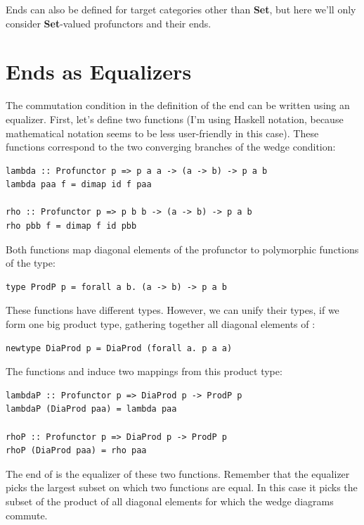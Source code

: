 Ends can also be defined for target categories other than \textbf{Set},
but here we'll only consider \textbf{Set}-valued profunctors and their
ends.

\section{Ends as Equalizers}\label{ends-as-equalizers}

The commutation condition in the definition of the end can be written
using an equalizer. First, let's define two functions (I'm using Haskell
notation, because mathematical notation seems to be less user-friendly
in this case). These functions correspond to the two converging branches
of the wedge condition:

\begin{Verbatim}[commandchars=\\\{\}]
lambda :: Profunctor p => p a a -> (a -> b) -> p a b
lambda paa f = dimap id f paa

rho :: Profunctor p => p b b -> (a -> b) -> p a b
rho pbb f = dimap f id pbb
\end{Verbatim}
Both functions map diagonal elements of the profunctor  to
polymorphic functions of the type:

\begin{Verbatim}[commandchars=\\\{\}]
type ProdP p = forall a b. (a -> b) -> p a b
\end{Verbatim}
These functions have different types. However, we can unify their types,
if we form one big product type, gathering together all diagonal
elements of :

\begin{Verbatim}[commandchars=\\\{\}]
newtype DiaProd p = DiaProd (forall a. p a a)
\end{Verbatim}
The functions  and  induce two mappings from
this product type:

\begin{Verbatim}[commandchars=\\\{\}]
lambdaP :: Profunctor p => DiaProd p -> ProdP p
lambdaP (DiaProd paa) = lambda paa

rhoP :: Profunctor p => DiaProd p -> ProdP p
rhoP (DiaProd paa) = rho paa
\end{Verbatim}
The end of  is the equalizer of these two functions. Remember
that the equalizer picks the largest subset on which two functions are
equal. In this case it picks the subset of the product of all diagonal
elements for which the wedge diagrams commute.


